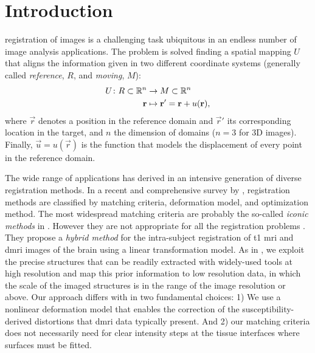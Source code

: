 \section{Introduction}
\label{sec:introduction}

 registration of images is a challenging task ubiquitous
  in an endless number of image analysis applications.
The problem is solved finding a spatial mapping $U$ that aligns the
  information given in two different coordinate systems (generally called
  \emph{reference}, $R$, and \emph{moving}, $M$):
  \begin{align}
  U\colon R \subset \mathbb{R}^n &\to M \subset \mathbb{R}^n \notag\\
  \vec{r} &\mapsto \vec{r}' =\vec{r}+u(\vec{r}),
  \label{eq:transform}
  \end{align}
  where $\vec{r}$ denotes a position in the reference domain and $\vec{r}'$
  its corresponding location in the target, and $n$ the dimension of domains
  ($n=3$ for 3D images).
Finally, $\vec{u} = u(\vec{r})$ is the function that models the displacement
  of every point in the reference domain.

The wide range of applications has derived in an intensive generation of diverse
  registration methods.
In a recent and comprehensive survey by \citeauthor{sotiras_deformable_2013}
  \citep{sotiras_deformable_2013}, registration methods are classified by
  matching criteria, deformation model, and optimization method.
The most widespread matching criteria are probably the so-called \emph{iconic
  methods} in \citep{sotiras_deformable_2013}.
However they are not appropriate for all the registration problems
  \citep{greve_accurate_2009}.
They propose a \emph{hybrid method} \citep{sotiras_deformable_2013} for the
  intra-subject registration of \gls*{t1} \gls*{mri} and \gls*{dmri} images
  of the brain using a linear transformation model.
As in \citep{greve_accurate_2009}, we exploit the precise structures that
  can be readily extracted with widely-used tools at high resolution
  and map this prior information to low resolution data,
  in which the scale of the imaged structures is in the range of the image
  resolution or above.
Our approach differs with \citep{greve_accurate_2009} in two fundamental
  choices: 1) We use a nonlinear deformation model that enables the
  correction of the susceptibility-derived distortions
  \citep{jezzard_correction_1995} that \gls*{dmri} data typically present.
And 2) our matching criteria does not necessarily need for clear intensity
  steps at the tissue interfaces where surfaces must be fitted.

